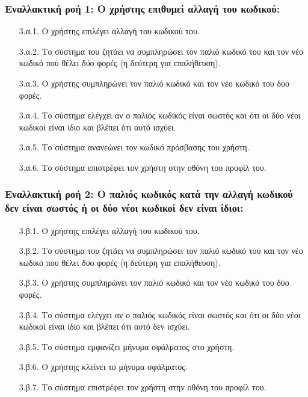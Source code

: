 \documentclass[12pt,a4paper]{article}
\begin{document}
\subsubsection*{Εναλλακτική ροή 1: Ο χρήστης επιθυμεί αλλαγή του κωδικού:}
\begin{enumerate}
    \item [3.α.1.] Ο χρήστης επιλέγει αλλαγή του κωδικού του. 
    \item [3.α.2.] Το σύστημα του ζητάει να συμπληρώσει τον παλιό κωδικό του και τον νέο κωδικό που θέλει δύο φορές (η δεύτερη για επαλήθευση).
    \item [3.α.3.] Ο χρήστης συμπληρώνει τον παλιό κωδικό και τον νέο κωδικό του δύο φορές.
    \item [3.α.4.] Το σύστημα ελέγχει αν ο παλιός κωδικός είναι σωστός και ότι οι δύο νέοι κωδικοί είναι ίδιο και βλέπει ότι αυτό ισχύει.
    \item [3.α.5.] Το σύστημα ανανεώνει τον κωδικό πρόσβασης του χρήστη.
    \item [3.α.6.] Το σύστημα επιστρέφει τον χρήστη στην οθόνη του προφίλ του.
\end{enumerate}

\subsubsection*{Εναλλακτική ροή 2: Ο παλιός κωδικός κατά την αλλαγή κωδικού δεν είναι σωστός ή οι δύο νέοι κωδικοί δεν είναι ίδιοι:}
\begin{enumerate}
    \item [3.β.1.] Ο χρήστης επιλέγει αλλαγή του κωδικού του.
    \item [3.β.2.] Το σύστημα του ζητάει να συμπληρώσει τον παλιό κωδικό του και τον νέο κωδικό που θέλει δύο φορές (η δεύτερη για επαλήθευση).
    \item [3.β.3.] Ο χρήστης συμπληρώνει τον παλιό κωδικό και τον νέο κωδικό του δύο φορές.
    \item [3.β.4.] Το σύστημα ελέγχει αν ο παλιός κωδικός είναι σωστός και ότι οι δύο νέοι κωδικοί είναι ίδιο και βλέπει ότι αυτό δεν ισχύει.
    \item [3.β.5.] Το σύστημα εμφανίζει μήνυμα σφάλματος στο χρήστη.
    \item [3.β.6.] Ο χρήστης κλείνει το μήνυμα σφάλματος.
    \item [3.β.7.] Το σύστημα επιστρέφει τον χρήστη στην οθόνη του προφίλ του.
\end{enumerate}
\end{document}

